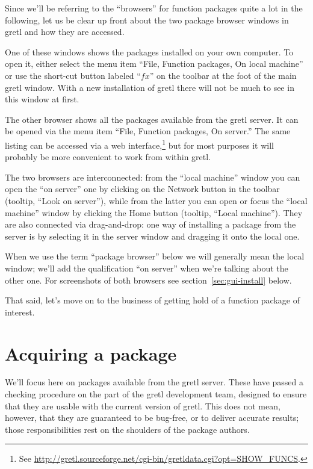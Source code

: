 \documentclass[oneside]{book}
\begin{document}
Since we'll be referring to the ``browsers'' for function packages
quite a lot in the following, let us be clear up front about the two
package browser windows in gretl and how they are accessed.

One of these windows shows the packages installed on your own
computer. To open it, either select the menu item ``File, Function
packages, On local machine'' or use the short-cut button labeled
``$fx$'' on the toolbar at the foot of the main gretl
window. With a new installation of gretl there will not be much to see
in this window at first.

The other browser shows all the packages available from the gretl
server. It can be opened via the menu item ``File, Function packages,
On server.'' The same listing can be accessed via a web
interface,\footnote{See
  \url{http://gretl.sourceforge.net/cgi-bin/gretldata.cgi?opt=SHOW_FUNCS}.}
but for most purposes it will probably be more convenient to work from
within gretl.

The two browsers are interconnected: from the ``local machine'' window
you can open the ``on server'' one by clicking on the Network button
in the toolbar (tooltip, ``Look on server''), while from the latter
you can open or focus the ``local machine'' window by clicking the
Home button (tooltip, ``Local machine''). They are also connected via
drag-and-drop: one way of installing a package from the server is by
selecting it in the server window and dragging it onto the local one.

When we use the term ``package browser'' below we will generally mean
the local window; we'll add the qualification ``on server'' when we're
talking about the other one. For screenshots of both browsers see
section~\ref{sec:gui-install} below.

That said, let's move on to the business of getting hold of a function
package of interest.

\section{Acquiring a package}
\label{sec:acquire}

We'll focus here on packages available from the gretl server. These
have passed a checking procedure on the part of the gretl development
team, designed to ensure that they are usable with the current version
of gretl. This does not mean, however, that they are guaranteed to be
bug-free, or to deliver accurate results; those responsibilities rest
on the shoulders of the package authors.
\end{document}
